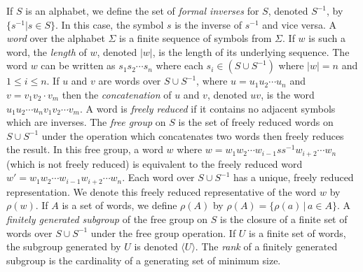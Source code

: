 \documentclass{article}
\newcommand{\gen}[1]{\langle #1 \rangle}
\begin{document}
If $S$ is an alphabet, we define the set of \emph{formal inverses} for $S$, denoted $S^{-1}$, by $\{ s^{-1} | s \in S \}$.
In this case, the symbol $s$ is the inverse of $s^{-1}$ and vice versa.
A \emph{word} over the alphabet $\Sigma$ is a finite sequence of symbols from $\Sigma$.
If $w$ is such a word, the \emph{length} of $w$, denoted $|w|$, is the length of its underlying sequence.
The word $w$ can be written as $s_1s_2\cdots s_n$ where each $s_i \in (S \cup S^{-1})$ where $|w| = n$ and $1 \leq i \leq n$.
If $u$ and $v$ are words over $S \cup S^{-1}$, where $u = u_1 u_2\cdots u_n$ and $v = v_1 v_2 \cdot v_m$ then the \emph{concatenation} of $u$ and $v$, denoted $uv$, is the word $u_1 u_2 \cdots u_n v_1 v_2 \cdots v_m$.
A word is \emph{freely reduced} if it contains no adjacent symbols which are inverses.
The \emph{free group} on $S$ is the set of freely reduced words on $S \cup S^{-1}$ under the operation which concatenates two words then freely reduces the result.
In this free group, a word $w$ where $w = w_1 w_2 \cdots w_{i - 1} s s^{-1} w_{i + 2} \cdots w_n$ (which is not freely reduced) is equivalent to the freely reduced word $w' = w_1 w_2 \cdots w_{i - 1} w_{i + 2} \cdots w_n$.
Each word over $S \cup S^{-1}$ has a unique, freely reduced representation. \cite{citationneeded}
We denote this freely reduced representative of the word $w$ by $\rho(w)$.
If $A$ is a set of words, we define $\rho(A)$ by $\rho(A) = \{ \rho(a) \, | \, a \in A\}$.
A \emph{finitely generated subgroup} of the free group on $S$ is the closure of a finite set of words over $S \cup S^{-1}$ under the free group operation.
If $U$ is a finite set of words, the subgroup generated by $U$ is denoted $\gen{U}$.
The \emph{rank} of a finitely generated subgroup is the cardinality of a generating set of minimum size.
\end{document}
